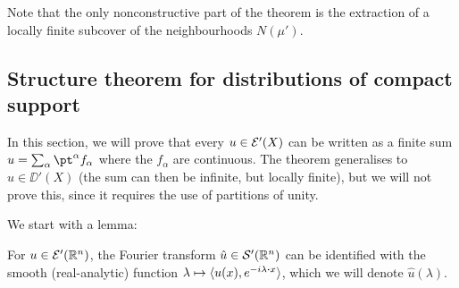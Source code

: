 Note that the only nonconstructive part of the theorem is the extraction of a locally finite subcover of the neighbourhoods $N(\mu')$. 

\subsection{Structure theorem for distributions of compact support}
In this section, we will prove that every $u \in \mathcal E'(X)$ can be written as a finite sum $u = \sum_\alpha \pt^\alpha f_\alpha$ where the $f_\alpha$ are continuous. The theorem generalises to $u \in \DD'(X)$ (the sum can then be infinite, but locally finite), but we will not prove this, since it requires the use of partitions of unity. 

We start with a lemma:
\begin{lemma}
	For $u \in \mathcal E'(\mathbb R^n)$, the Fourier transform $\hat u \in \mathcal S'(\mathbb R^n)$ can be identified with the smooth (real-analytic) function $\lambda \mapsto \ang{u(x), e^{-i\lambda\vdot x}}$, which we will denote $\hat u(\lambda)$. 
\end{lemma}

